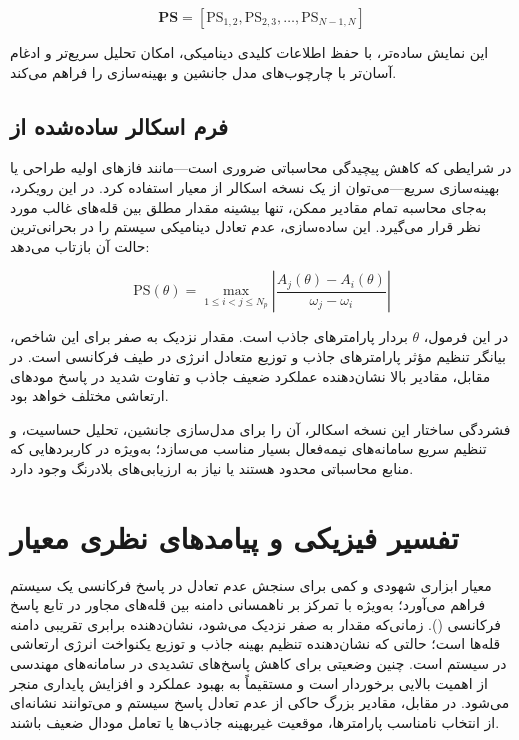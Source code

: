 \begin{equation}
\mathbf{PS} = \left[ \mathrm{PS}_{1,2}, \mathrm{PS}_{2,3}, \ldots, \mathrm{PS}_{N-1,N} \right]
\end{equation}

این نمایش ساده‌تر، با حفظ اطلاعات کلیدی دینامیکی، امکان تحلیل سریع‌تر و ادغام آسان‌تر با چارچوب‌های مدل جانشین و بهینه‌سازی را فراهم می‌کند.

\subsection{فرم اسکالر ساده‌شده از }

در شرایطی که کاهش پیچیدگی محاسباتی ضروری است—مانند فازهای اولیه طراحی یا بهینه‌سازی سریع—می‌توان از یک نسخه اسکالر از معیار  استفاده کرد. در این رویکرد، به‌جای محاسبه تمام مقادیر  ممکن، تنها بیشینه مقدار مطلق بین قله‌های غالب مورد نظر قرار می‌گیرد. این ساده‌سازی، عدم تعادل دینامیکی سیستم را در بحرانی‌ترین حالت آن بازتاب می‌دهد:

\begin{equation}
\mathrm{PS}(\theta) = \max_{1 \le i < j \le N_p} \left| \frac{A_j(\theta) - A_i(\theta)}{\omega_j - \omega_i} \right|
\end{equation}

در این فرمول، $\theta$ بردار پارامترهای جاذب است. مقدار نزدیک به صفر برای این شاخص، بیانگر تنظیم مؤثر پارامترهای جاذب و توزیع متعادل انرژی در طیف فرکانسی است. در مقابل، مقادیر بالا نشان‌دهنده عملکرد ضعیف جاذب و تفاوت شدید در پاسخ مودهای ارتعاشی مختلف خواهد بود.

فشردگی ساختار این نسخه اسکالر، آن را برای مدل‌سازی جانشین، تحلیل حساسیت، و تنظیم سریع سامانه‌های نیمه‌فعال بسیار مناسب می‌سازد؛ به‌ویژه در کاربردهایی که منابع محاسباتی محدود هستند یا نیاز به ارزیابی‌های بلادرنگ وجود دارد.


\section{تفسیر فیزیکی و پیامدهای نظری معیار }

معیار  ابزاری شهودی و کمی برای سنجش عدم تعادل در پاسخ فرکانسی یک سیستم فراهم می‌آورد؛ به‌ویژه با تمرکز بر ناهمسانی دامنه بین قله‌های مجاور در تابع پاسخ فرکانسی (). زمانی‌که مقدار  به صفر نزدیک می‌شود، نشان‌دهنده برابری تقریبی دامنه قله‌ها است؛ حالتی که نشان‌دهنده تنظیم بهینه جاذب و توزیع یکنواخت انرژی ارتعاشی در سیستم است. چنین وضعیتی برای کاهش پاسخ‌های تشدیدی در سامانه‌های مهندسی از اهمیت بالایی برخوردار است و مستقیماً به بهبود عملکرد و افزایش پایداری منجر می‌شود. در مقابل، مقادیر بزرگ  حاکی از عدم تعادل پاسخ سیستم و می‌توانند نشانه‌ای از انتخاب نامناسب پارامترها، موقعیت غیربهینه جاذب‌ها یا تعامل مودال ضعیف باشند.


